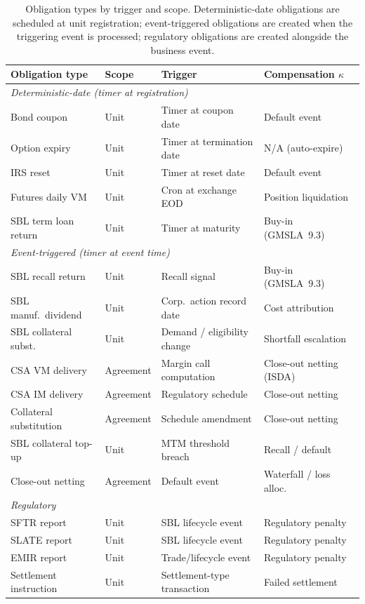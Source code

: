 \documentclass[11pt,a4paper]{article}
\begin{document}
\begin{table}[ht]
\centering
\small
\begin{tabular}{l l l l}
\toprule
\textbf{Obligation type} & \textbf{Scope} & \textbf{Trigger} & \textbf{Compensation $\kappa$} \\
\midrule
\multicolumn{4}{l}{\textit{Deterministic-date (timer at registration)}} \\
Bond coupon & Unit & Timer at coupon date & Default event \\
Option expiry & Unit & Timer at termination date & N/A (auto-expire) \\
IRS reset & Unit & Timer at reset date & Default event \\
Futures daily VM & Unit & Cron at exchange EOD & Position liquidation \\
SBL term loan return & Unit & Timer at maturity & Buy-in (GMSLA~9.3) \\
\midrule
\multicolumn{4}{l}{\textit{Event-triggered (timer at event time)}} \\
SBL recall return & Unit & Recall signal & Buy-in (GMSLA~9.3) \\
SBL manuf.\ dividend & Unit & Corp.\ action record date & Cost attribution \\
SBL collateral subst. & Unit & Demand / eligibility change & Shortfall escalation \\
CSA VM delivery & Agreement & Margin call computation & Close-out netting (ISDA) \\
CSA IM delivery & Agreement & Regulatory schedule & Close-out netting \\
Collateral substitution & Agreement & Schedule amendment & Close-out netting \\
SBL collateral top-up & Unit & MTM threshold breach & Recall / default \\
Close-out netting & Agreement & Default event & Waterfall / loss alloc. \\
\midrule
\multicolumn{4}{l}{\textit{Regulatory}} \\
SFTR report & Unit & SBL lifecycle event & Regulatory penalty \\
SLATE report & Unit & SBL lifecycle event & Regulatory penalty \\
EMIR report & Unit & Trade/lifecycle event & Regulatory penalty \\
Settlement instruction & Unit & Settlement-type transaction & Failed settlement \\
\bottomrule
\end{tabular}
\caption{Obligation types by trigger and scope. Deterministic-date obligations are scheduled at unit registration; event-triggered obligations are created when the triggering event is processed; regulatory obligations are created alongside the business event.}
\label{tab:obligation-types}
\end{table}
\end{document}
